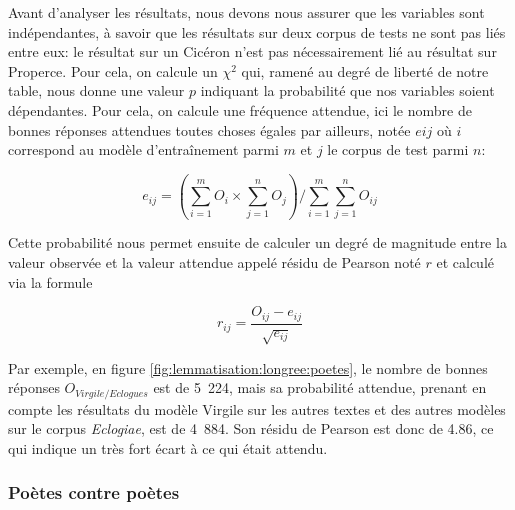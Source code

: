 Avant d'analyser les résultats, nous devons nous assurer que les variables sont indépendantes, à savoir que les résultats sur deux corpus de tests ne sont pas liés entre eux: le résultat sur un Cicéron n'est pas nécessairement lié au résultat sur Properce. Pour cela, on calcule un $\chi^{2}$ qui, ramené au degré de liberté de notre table, nous donne une valeur $p$ indiquant la probabilité que nos variables soient dépendantes. Pour cela, on calcule une fréquence attendue, ici le nombre de bonnes réponses attendues toutes choses égales par ailleurs, notée $e{ij}$ où $i$ correspond au modèle d'entraînement parmi $m$ et $j$ le corpus de test parmi $n$:

\begin{equation}
    e_{ij} = \left ( \sum_{i=1}^{m}O_{i} \times \sum_{j=1}^{n}O_{j}  \right ) / \sum_{i=1}^{m}\sum_{j=1}^{n}O_{ij}
\end{equation}

Cette probabilité nous permet ensuite de calculer un degré de magnitude entre la valeur observée et la valeur attendue appelé résidu de Pearson noté $r$ et calculé via la formule

\begin{equation}
    r_{ij} = \frac{O_{ij} - e_{ij}}{\sqrt{e_{ij}}}
\end{equation}

Par exemple, en figure \ref{fig:lemmatisation:longree:poetes}, le nombre de bonnes réponses $O_{Virgile/Eclogues}$ est de 5~224, mais sa probabilité attendue, prenant en compte les résultats du modèle Virgile sur les autres textes et des autres modèles sur le corpus \textit{Eclogiae}, est de 4~884. Son résidu de Pearson est donc de 4.86, ce qui indique un très fort écart à ce qui était attendu.

\subsubsection{Poètes contre poètes}


